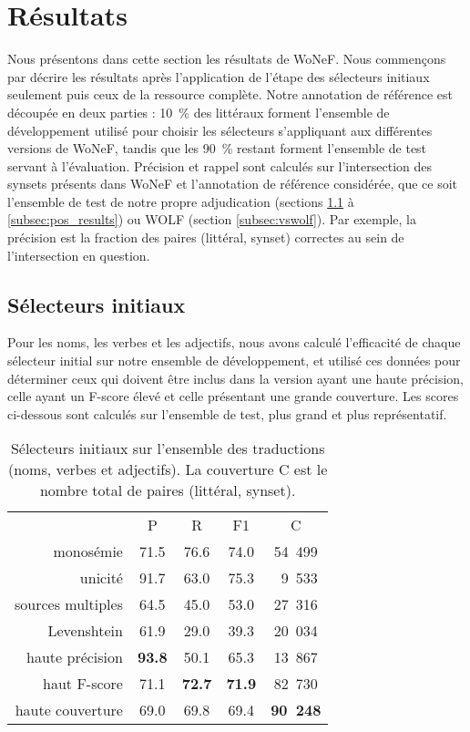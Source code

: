 \section{Résultats}
\label{sec:results}

Nous présentons dans cette section les résultats de WoNeF. Nous commençons par
décrire les résultats après l'application de l'étape des sélecteurs initiaux
seulement puis ceux de la ressource complète. Notre annotation de référence est
découpée en deux parties : 10~\% des littéraux forment l'ensemble de
développement utilisé pour choisir les sélecteurs s'appliquant aux différentes
versions de WoNeF, tandis que les 90~\% restant forment l'ensemble de test
servant à l'évaluation. Précision et rappel sont calculés sur l'intersection
des synsets présents dans WoNeF et l'annotation de référence considérée, que ce
soit l'ensemble de test de notre propre adjudication (sections
\ref{subsec:heuristics} à \ref{subsec:pos_results}) ou WOLF (section
\ref{subsec:vswolf}). Par exemple, la précision est la fraction des paires
(littéral, synset) correctes au sein de l'intersection en question.

\subsection{Sélecteurs initiaux}
\label{subsec:heuristics}

Pour les noms, les verbes et les adjectifs, nous avons calculé l'efficacité de
chaque sélecteur initial sur notre ensemble de développement, et utilisé ces
données pour déterminer ceux qui doivent être inclus dans la version ayant une
haute précision, celle ayant un F-score élevé et celle présentant une grande
couverture. Les scores ci-dessous sont calculés sur l'ensemble de test, plus
grand et plus représentatif.

\let\b\textbf

\begin{table}[ht]
\centering
\begin{tabular}{rcccc}
  \toprule
                    & P & R & F1 & C \\
  monosémie         & 71.5 & 76.6 & 74.0 & 54~499 \\
  unicité           & 91.7 & 63.0 & 75.3 & ~9~533 \\
  sources multiples & 64.5 & 45.0 & 53.0 & 27~316 \\
  Levenshtein       & 61.9 & 29.0 & 39.3 & 20~034 \\
  \midrule
  haute précision   & \b{93.8} & 50.1     & 65.3     & 13~867 \\
  haut F-score      & 71.1     & \b{72.7} & \b{71.9} & 82~730 \\
  haute couverture  & 69.0     & 69.8     & 69.4     & \b{90~248} \\
  \bottomrule
\end{tabular}
\caption{\label{table:heuristics}Sélecteurs initiaux sur l'ensemble des traductions (noms, verbes et adjectifs). La couverture C est le nombre total de paires (littéral, synset).}
\end{table}


